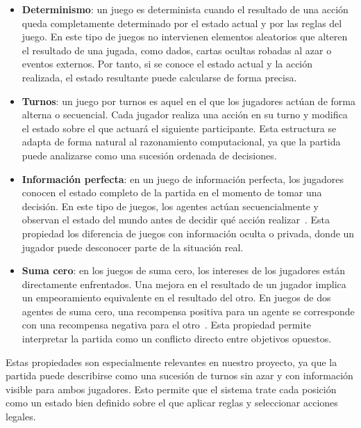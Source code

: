 \begin{itemize}
    \item \textbf{Determinismo}: un juego es determinista cuando el resultado de una acción queda completamente determinado por el estado actual y por las reglas del juego. En este tipo de juegos no intervienen elementos aleatorios que alteren el resultado de una jugada, como dados, cartas ocultas robadas al azar o eventos externos. Por tanto, si se conoce el estado actual y la acción realizada, el estado resultante puede calcularse de forma precisa.

    \item \textbf{Turnos}: un juego por turnos es aquel en el que los jugadores actúan de forma alterna o secuencial. Cada jugador realiza una acción en su turno y modifica el estado sobre el que actuará el siguiente participante. Esta estructura se adapta de forma natural al razonamiento computacional, ya que la partida puede analizarse como una sucesión ordenada de decisiones.

    \item \textbf{Información perfecta}: en un juego de información perfecta, los jugadores conocen el estado completo de la partida en el momento de tomar una decisión. En este tipo de juegos, los agentes actúan secuencialmente y observan el estado del mundo antes de decidir qué acción realizar~\cite{poole2023foundations}. Esta propiedad los diferencia de juegos con información oculta o privada, donde un jugador puede desconocer parte de la situación real.

    \item \textbf{Suma cero}: en los juegos de suma cero, los intereses de los jugadores están directamente enfrentados. Una mejora en el resultado de un jugador implica un empeoramiento equivalente en el resultado del otro. En juegos de dos agentes de suma cero, una recompensa positiva para un agente se corresponde con una recompensa negativa para el otro~\cite{poole2023foundations}. Esta propiedad permite interpretar la partida como un conflicto directo entre objetivos opuestos.
\end{itemize}

Estas propiedades son especialmente relevantes en nuestro proyecto, ya que la partida puede describirse como una sucesión de turnos sin azar y con información visible para ambos jugadores. Esto permite que el sistema trate cada posición como un estado bien definido sobre el que aplicar reglas y seleccionar acciones legales.


